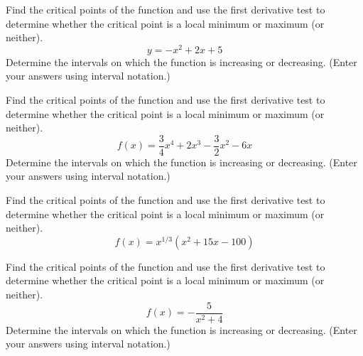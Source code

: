 \documentclass[12pt,addpoints, answers, fleqn]{exam}
\begin{document}
\begin{teacher}
\begin{questions}

\question 	%

Find the critical points of the function and use the first derivative test to determine whether the critical point is a local minimum or maximum (or neither).
\[
y = -x^2 + 2x + 5
\]
Determine the intervals on which the function is increasing or decreasing. (Enter your answers using interval notation.)
\begin{solution}
\end{solution}
\question 	%

Find the critical points of the function and use the first derivative test to determine whether the critical point is a local minimum or maximum (or neither).
\[
f\left(x\right)  = \frac{3}{4}x^4 + 2x^3 - \frac{3}{2} x^2 -6x
\]
Determine the intervals on which the function is increasing or decreasing. (Enter your answers using interval notation.)
\begin{solution}
\end{solution}

\question 	%

Find the critical points of the function and use the first derivative test to determine whether the critical point is a local minimum or maximum (or neither).
\[
f\left(x\right) = x^{1/3}\left(x^2 + 15x - 100\right)
\]
\begin{solution}
\end{solution}
\question 	%

Find the critical points of the function and use the first derivative test to determine whether the critical point is a local minimum or maximum (or neither).
\[
f\left(x\right) = -\frac{5}{x^2+4}
\]
Determine the intervals on which the function is increasing or decreasing. (Enter your answers using interval notation.)
\begin{solution}
\end{solution}
\question 	%


\end{questions}
\end{teacher}
\end{document}

